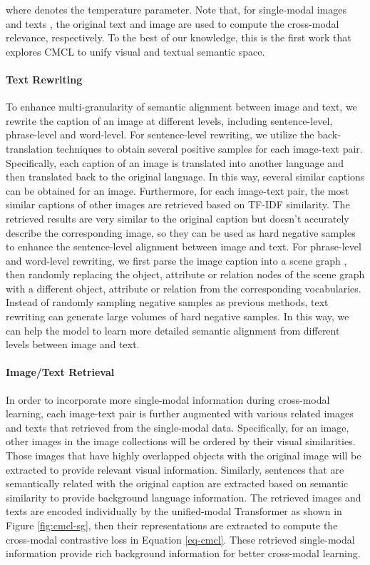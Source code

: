 \documentclass[11pt,a4paper]{article}
\begin{document}
where  denotes the temperature parameter. Note that, for single-modal images  and texts , the original text  and image  are used to compute the cross-modal relevance, respectively. To the best of our knowledge, this is the first work that explores CMCL to unify visual and textual semantic space.




\paragraph{Text Rewriting}
To enhance multi-granularity of semantic alignment between image and text, we rewrite the caption of an image at different levels, including sentence-level, phrase-level and word-level.
For sentence-level rewriting, we utilize the back-translation techniques \citep{edunov-etal-2018-understanding} to obtain several positive samples for each image-text pair.
Specifically, each caption of an image is translated into another language and then translated back to the original language.
In this way, several similar captions can be obtained for an image.
Furthermore, for each image-text pair, the most similar captions of other images are retrieved based on TF-IDF similarity.
The retrieved results are very similar to the original caption but doesn't accurately describe the corresponding image, so they can be used as hard negative samples to enhance the sentence-level alignment between image and text.
For phrase-level and word-level rewriting, we first parse the image caption into a scene graph \citep{wang-etal-2018-scene}, then randomly replacing the object, attribute or relation nodes of the scene graph with a different object, attribute or relation from the corresponding vocabularies.
Instead of randomly sampling negative samples as previous methods, text rewriting can generate large volumes of hard negative samples.
In this way, we can help the model to learn more detailed semantic alignment from different levels between image and text.

\paragraph{Image/Text Retrieval}
In order to incorporate more single-modal information during cross-modal learning, each image-text pair is further augmented with various related images and texts that retrieved from the single-modal data. 
Specifically, for an image, other images in the image collections will be ordered by their visual similarities.
Those images that have highly overlapped objects with the original image will be extracted to provide relevant visual information.
Similarly, sentences that are semantically related with the original caption are extracted based on semantic similarity to provide background language information.
The retrieved images and texts are encoded individually by the unified-modal Transformer as shown in Figure \ref{fig:cmcl-sg}, then their representations are extracted to compute the cross-modal contrastive loss in Equation \ref{eq-cmcl}.
These retrieved single-modal information provide rich background information for better cross-modal learning.
\end{document}
